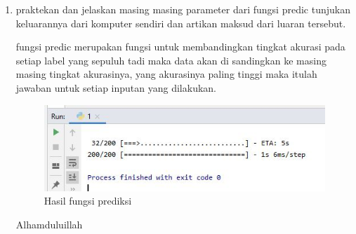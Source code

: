 \begin{enumerate}
\item praktekan dan jelaskan masing masing parameter dari fungsi predic  tunjukan keluarannya dari komputer sendiri dan artikan maksud dari luaran tersebut. \par 
\subitem fungsi predic merupakan fungsi untuk membandingkan tingkat akurasi pada setiap label yang sepuluh tadi maka data akan di sandingkan ke masing masing tingkat akurasinya, yang akurasinya paling tinggi maka itulah jawaban untuk setiap inputan yang dilakukan. 

\begin{figure}[ht]
\centering
\includegraphics[scale=0.5]{figures/1174042/chapter6/2,11.JPG}
\caption{Hasil fungsi prediksi}
\label{contoh}
\end{figure}

Alhamduluillah
\end{enumerate}

